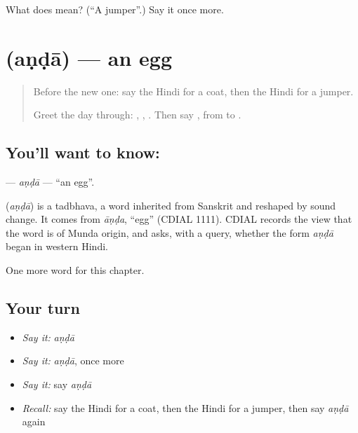 \begin{tcolorbox}[breakable,colback=teal!4,colframe=teal!35!black,title={Before you move on}]
What does  mean? (\textquotedblleft{}A jumper\textquotedblright{}.) Say it once more.
\end{tcolorbox}
\section[\texorpdfstring{\hi{अंडा} (aṇḍā)}{अंडा (aṇḍā)}]{ (aṇḍā) — an egg}

\label{lesson:HI-C137-anda}



\begin{quote}
Before the new one: say the Hindi for a coat, then the Hindi for a jumper.

Greet the day through: \textbf{}, \textbf{ }, \textbf{ }. Then say \textbf{   }, from \textbf{} to \textbf{}.
\end{quote}

\subsection*{You'll want to know: }
\textbf{} — \emph{aṇḍā} — \textquotedblleft{}an egg\textquotedblright{}.

\begin{cousinweb}
\textbf{} (\emph{aṇḍā}) is a tadbhava, a word inherited from Sanskrit and reshaped by sound change. It comes from \emph{āṇḍa}, \textquotedblleft{}egg\textquotedblright{} (CDIAL 1111). CDIAL records the view that the word is of Munda origin, and asks, with a query, whether the form \emph{aṇḍā} began in western Hindi.
\end{cousinweb}

\begin{grammarlens}[title={What you've built}]
One more word for this chapter.
\end{grammarlens}

\subsection*{Your turn}
\begin{itemize}
\raggedright
  \item \emph{Say it:} \emph{aṇḍā}
  \item \emph{Say it:} \emph{aṇḍā}, once more
  \item \emph{Say it:} say \emph{aṇḍā}
  \item \emph{Recall:} say the Hindi for a coat, then the Hindi for a jumper, then say \emph{aṇḍā} again
\end{itemize}


